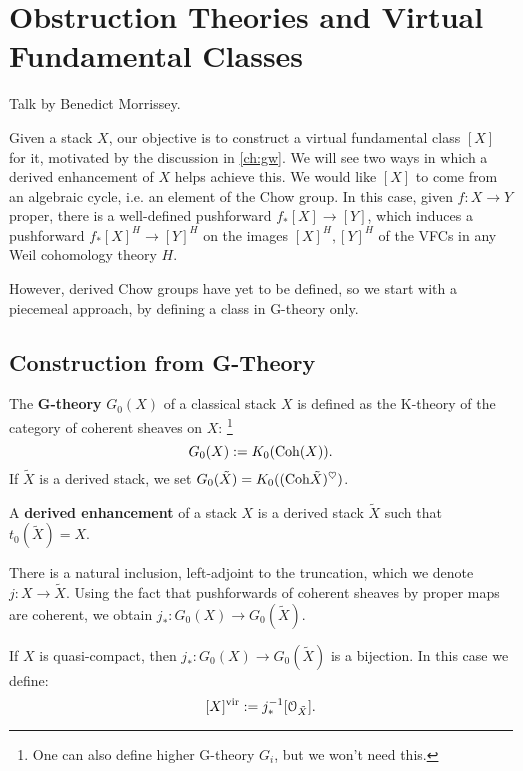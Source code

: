 \chapter{Obstruction Theories and Virtual Fundamental Classes}
\label{ch2:obs}
Talk by Benedict Morrissey.

Given a stack $X$, our objective is to construct a virtual fundamental class $[X]$ for it, motivated by the discussion in
\ref{ch:gw}. We will see two ways in which a derived enhancement of $X$ helps achieve this.
We would like $[X]$ to come from an algebraic cycle, i.e. an element of the Chow group.
In this case, given $f: X\to Y$ proper,
there is a well-defined pushforward  $f_*[X] \to [Y]$, which induces a pushforward
$f_*[X]^H \to [Y]^H$ on the images $[X]^H, [Y]^H$ of the VFCs in any Weil cohomology theory $H$.

However, derived Chow groups have yet to be defined, so we start with a piecemeal approach, by
defining a class in G-theory only.


\section{Construction from G-Theory}
\begin{defin}
The \textbf{G-theory} $G_0(X)$ of a classical stack $X$ is defined as the K-theory of the category of coherent sheaves on $X$:
\footnote{One can also define higher G-theory $G_i$, but we won't need this.}
\[	G_0(X) := K_0(\mathrm{Coh}(X)) .	\]
If $\tilde X$ is a derived stack, we set $G_0(\tilde X) = K_0((\mathrm{Coh} \tilde X)^{\heartsuit})$.
\end{defin}

\begin{defin}
A \textbf{derived enhancement} of a stack $X$ is a derived stack $\tilde X$ such that $t_0(\tilde X) = X$.
\end{defin}

There is a natural inclusion, left-adjoint to the truncation, which we denote $j: X \to \tilde X$.
Using the fact that pushforwards of coherent sheaves by proper maps are coherent,
we obtain $j_* : G_0(X) \to G_0(\tilde X)$.

\begin{prop}
If $X$ is quasi-compact, then $j_* : G_0(X) \to G_0(\tilde X)$ is a bijection. In this case we define:
\[	 [X]^{\operatorname{vir}} := j_*^{-1}[\mathcal{O}_{\tilde X}].	\]
\end{prop}

